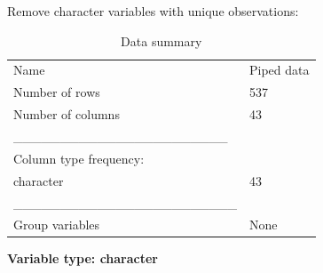\documentclass[]{article}
\newenvironment{Shaded}{\begin{snugshade}}{\end{snugshade}}
\newcommand{\KeywordTok}[1]{\textcolor[rgb]{0.13,0.29,0.53}{\textbf{#1}}}
\newcommand{\StringTok}[1]{\textcolor[rgb]{0.31,0.60,0.02}{#1}}
\newcommand{\OperatorTok}[1]{\textcolor[rgb]{0.81,0.36,0.00}{\textbf{#1}}}
\newcommand{\NormalTok}[1]{#1}
\begin{document}
Remove character variables with unique observations:

\begin{Shaded}
\end{Shaded}

\begin{longtable}[]{@{}ll@{}}
\caption{Data summary}\tabularnewline
\toprule
Name & Piped data\tabularnewline
Number of rows & 537\tabularnewline
Number of columns & 43\tabularnewline
\_\_\_\_\_\_\_\_\_\_\_\_\_\_\_\_\_\_\_\_\_\_\_ &\tabularnewline
Column type frequency: &\tabularnewline
character & 43\tabularnewline
\_\_\_\_\_\_\_\_\_\_\_\_\_\_\_\_\_\_\_\_\_\_\_\_ &\tabularnewline
Group variables & None\tabularnewline
\bottomrule
\end{longtable}

\textbf{Variable type: character}
\end{document}

